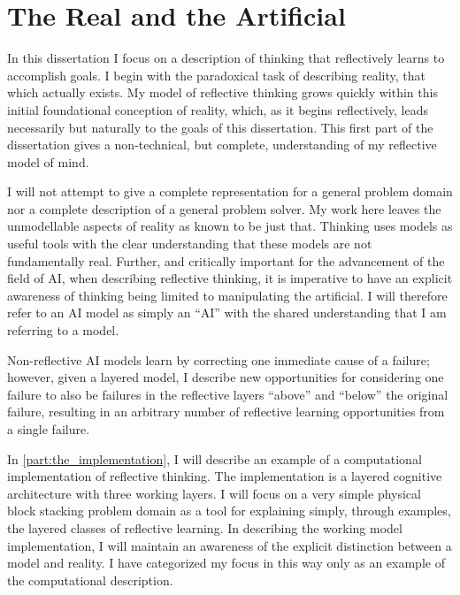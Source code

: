 \chapter{The Real and the Artificial}
\label{chapter:the_real_and_the_artificial}

In this dissertation I focus on a description of thinking that
reflectively learns to accomplish goals.  I begin with the paradoxical
task of describing reality, that which actually exists.  My model of
reflective thinking grows quickly within this initial foundational
conception of reality, which, as it begins reflectively, leads
necessarily but naturally to the goals of this dissertation.  This
first part of the dissertation gives a non-technical, but complete,
understanding of my reflective model of mind.

I will not attempt to give a complete representation for a general
problem domain nor a complete description of a general problem solver.
My work here leaves the unmodellable aspects of reality as known to be
just that.  Thinking uses models as useful tools with the clear
understanding that these models are not fundamentally real.  Further,
and critically important for the advancement of the field of AI, when
describing reflective thinking, it is imperative to have an explicit
awareness of thinking being limited to manipulating the artificial.  I
will therefore refer to an AI model as simply an ``AI'' with the
shared understanding that I am referring to a model.

Non-reflective AI models learn by correcting one immediate cause of a
failure; however, given a layered model, I describe new opportunities
for considering one failure to also be failures in the reflective
layers ``above'' and ``below'' the original failure, resulting in an
arbitrary number of reflective learning opportunities from a single
failure.

In \autoref{part:the_implementation}, I will describe an example of a
computational implementation of reflective thinking.  The
implementation is a layered cognitive architecture with three working
layers.  I will focus on a very simple physical block stacking problem
domain as a tool for explaining simply, through examples, the layered
classes of reflective learning.  In describing the working model
implementation, I will maintain an awareness of the explicit
distinction between a model and reality.  I have categorized my focus
in this way only as an example of the computational description.

